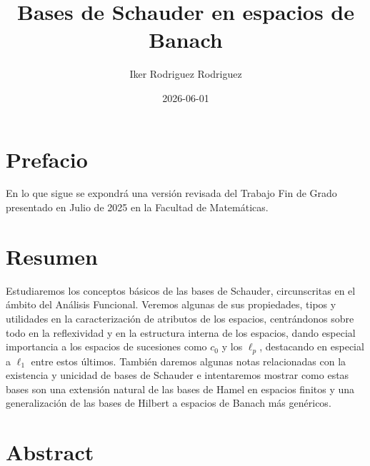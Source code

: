 \documentclass[
  spanish,
  letterpaper,
  DIV=11,
  numbers=noendperiod]{scrreprt}
\title{Bases de Schauder en espacios de Banach}
\author{Iker Rodriguez Rodriguez}
\date{2026-06-01}
\theoremstyle{definition}
\theoremstyle{remark}
\renewcommand{\contentsname}{\'Indice}
\theoremstyle{definition}
\theoremstyle{exampstyle}
\renewcommand*\contentsname{Tabla de contenidos}
\newcommand\contentsname{Tabla de contenidos}
\theoremstyle{plain}
\theoremstyle{plain}
\theoremstyle{definition}
\theoremstyle{plain}
\theoremstyle{remark}
\begin{document}
\maketitle

\renewcommand*\contentsname{Tabla de contenidos}
{
\setcounter{tocdepth}{2}
\tableofcontents
}


\chapter*{Prefacio}\label{prefacio}


En lo que sigue se expondrá una versión revisada del Trabajo Fin de
Grado presentado en Julio de 2025 en la Facultad de Matemáticas.


\chapter*{Resumen}\label{resumen}


Estudiaremos los conceptos básicos de las bases de Schauder,
circunscritas en el ámbito del Análisis Funcional. Veremos algunas de
sus propiedades, tipos y utilidades en la caracterización de atributos
de los espacios, centrándonos sobre todo en la reflexividad y en la
estructura interna de los espacios, dando especial importancia a los
espacios de sucesiones como \(c_0\) y los \(\ell_p\), destacando en
especial a \(\ell_1\) entre estos últimos. También daremos algunas notas
relacionadas con la existencia y unicidad de bases de Schauder e
intentaremos mostrar como estas bases son una extensión natural de las
bases de Hamel en espacios finitos y una generalización de las bases de
Hilbert a espacios de Banach más genéricos.

\vspace*{3.5cm}


\chapter*{Abstract}\label{abstract}

\end{document}
